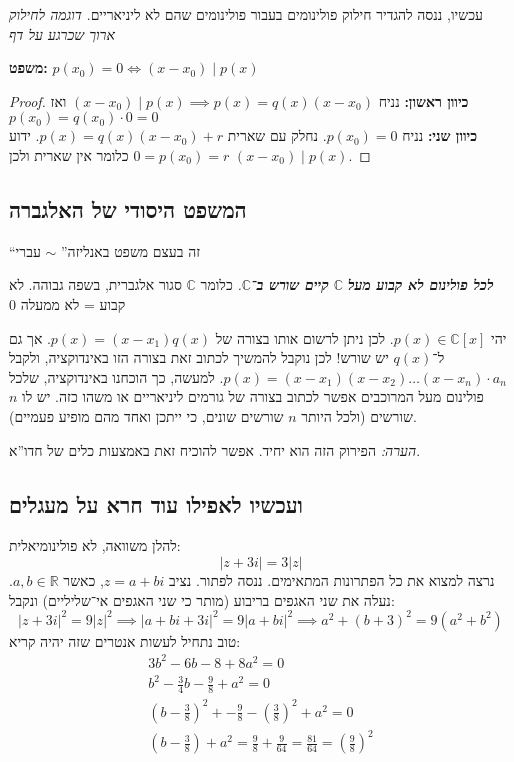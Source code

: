 \documentclass[]{article}
\newcommand\R     {\mathbb{R}}
\newcommand\C     {\mathbb{C}}
\begin{document}
	עכשיו, ננסה להגדיר חילוק פולינומים בעבור פולינומים שהם לא ליניאריים. 
	\textit{דוגמה לחילוק ארוך שכרגע על דף}
	
	\textbf{משפט: }$p(x_0) = 0 \iff (x - x_0) \mid p(x)$
	\begin{proof}
		\textbf{כיוון ראשון: }נניח $(x - x_0) \mid p(x) \implies p(x) = q(x)(x - x_0)$ ואז $p(x_0) = q(x_0) \cdot 0 = 0$ \\
		\textbf{כיוון שני: }נניח $p(x_0) = 0$. נחלק עם שארית $p(x) = q(x)(x - x_0) + r$. ידוע $0 = p(x_0) = r$ כלומר אין שארית ולכן $(x - x_0) \mid p(x)$. 
	\end{proof}
	
	\subsection{המשפט היסודי של האלגברה}
	``זה בעצם משפט באנליזה'' $\sim$ עברי
	
	\large \textit{\textbf{לכל פולינום לא קבוע מעל }$\bm{\C}$\textbf{ קיים שורש ב־}$\bm{\C}$.}
	\normalsize	כלומר $\C$ סגור אלגברית, בשפה גבוהה. 
	לא קבוע = לא ממעלה 0
	
	יהי $p(x) \in \C[x]$. לכן ניתן לרשום אותו בצורה של $p(x) = (x - x_1)q(x)$. אך גם ל־$q(x)$ יש שורש! לכן נוקבל להמשיך לכתוב זאת בצורה הזו באינדוקציה, ולקבל $p(x) = (x - x_1)(x - x_2) \dots (x - x_n) \cdot a_n $. למעשה, כך הוכחנו באינדוקציה, שלכל פולינום מעל המרוכבים אפשר לכתוב בצורה של גורמים ליניאריים או משהו כזה. יש לו $n$ שורשים (ולכל היותר $n$ שורשים שונים, כי ייתכן ואחד מהם מופיע פעמיים). 
	
	\textit{הערה: }הפירוק הזה הוא יחיד. אפשר להוכיח זאת באמצעות כלים של חדו''א. 
	
	\subsection{ועכשיו לאפילו עוד חרא על מעגלים}
	להלן משוואה, לא פולינומיאלית: 
	\[ |z + 3i| = 3|z| \]
	נרצה למצוא את כל הפתרונות המתאימים. ננסה לפתור. נציב $z = a + bi$, כאשר $a, b \in \R$. נעלה את שני האגפים בריבוע (מותר כי שני האגפים אי־שליליים) ונקבל: 
	\[ |z + 3i|^2 = 9|z|^2 \implies |a + bi + 3i|^2 = 9|a + bi|^2 \implies a^2 + (b + 3)^2 = 9(a^2 + b^2) \]
	טוב נתחיל לעשות אנטרים שזה יהיה קריא: 
	\begin{gather*}
		3b^2 - 6b - 8 + 8a^2 = 0 \\
		b^2 - \frac{3}{4}b - \frac{9}{8} + a^2 = 0 \\
		\left ( b - \frac{3}{8} \right )^2 +  -\frac{9}{8} - \left (\frac{3}{8} \right )^2  + a^2 = 0 \\
		\left (b - \frac{3}{8} \right ) + a^2 = \frac{9}{8} + \frac{9}{64} = \frac{81}{64} = \left (\frac{9}{8}\right )^2
	\end{gather*}
	
\end{document}
